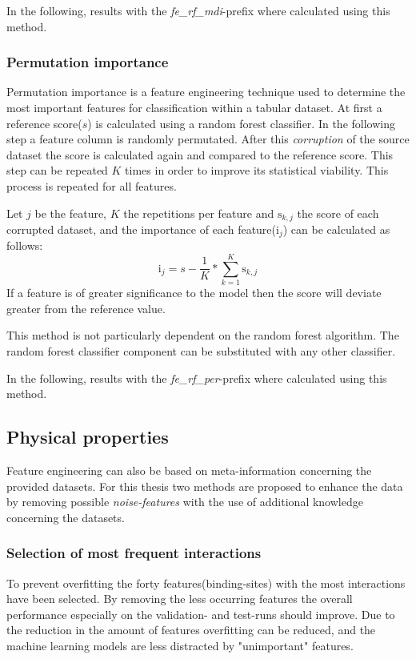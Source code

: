 In the following, results with the \textit{fe\_rf\_mdi}-prefix where calculated using this method.

\subsubsection*{Permutation importance}
Permutation importance is a feature engineering technique used to determine the most important features for classification within a tabular dataset.
At first a reference score($s$) is calculated using a random forest classifier. In the following step a feature column is randomly permutated.
After this \textit{corruption} of the source dataset the score is calculated again and compared to the reference score. This step can be repeated $K$ times in order
to improve its statistical viability. This process is repeated for all features.

Let $j$ be the feature, $K$ the repetitions per feature and $\mathrm{s}_{k,j}$ the score of each corrupted dataset, and the importance of each
feature($\mathrm{i}_{j}$) can be calculated as follows:
\begin{equation*}
    \mathrm{i}_{j} = s -\frac{1}{K}*\sum_{k=1}^{K} \mathrm{s}_{k,j}
\end{equation*}
If a feature is of greater significance to the model then the score will deviate greater from the reference value\cite[]{permutation_importance}.

This method is not particularly dependent on the random forest algorithm. The random forest classifier component can be substituted with any other classifier.

In the following, results with the \textit{fe\_rf\_per}-prefix where calculated using this method.

\subsection{Physical properties}
Feature engineering can also be based on meta-information concerning the provided datasets.
For this thesis two methods are proposed to enhance the data by removing possible \textit{noise-features} with the use of additional
knowledge concerning the datasets.
\subsubsection*{Selection of most frequent interactions}
To prevent overfitting the forty features(binding-sites) with the most interactions have been selected.
By removing the less occurring features the overall performance especially on the validation- and test-runs should improve.
Due to the reduction in the amount of features overfitting can be reduced, and the machine learning models are less distracted by
"unimportant" features.

